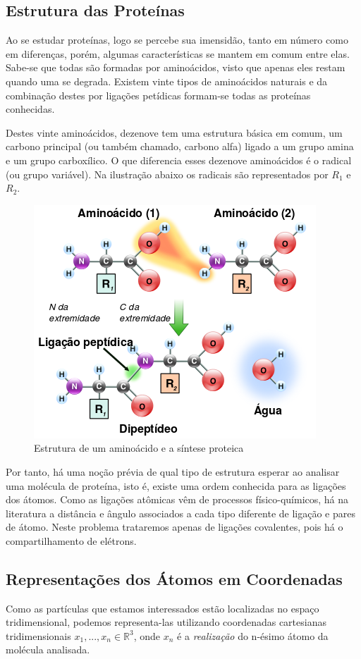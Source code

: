 \documentclass[a4paper,12pt]{article}
\begin{document}
	\subsection{Estrutura das Proteínas}
	Ao se estudar proteínas, logo se percebe sua imensidão, tanto em número como em diferenças, porém, algumas características se mantem em comum entre elas. Sabe-se que todas são formadas por aminoácidos, visto que apenas eles restam quando uma se degrada. Existem vinte tipos de aminoácidos naturais e da combinação destes por ligações petídicas formam-se todas as proteínas conhecidas. \cite{fidalgotese}
	
	Destes vinte aminoácidos, dezenove tem uma estrutura básica em comum, um carbono principal (ou também chamado, carbono alfa) ligado a um grupo amina e um grupo carboxílico. O que diferencia esses dezenove aminoácidos é o radical (ou grupo variável). Na ilustração abaixo os radicais são representados por $R_1$ e $R_2$.
	\\
	\begin{figure}[H]
		\begin{center}
			\includegraphics[width=0.6\linewidth]{Peptidformation.png}
		\end{center}
		\caption{Estrutura de um aminoácido e a síntese proteica}
		\label{}
	\end{figure}
	
	Por tanto, há uma noção prévia de qual tipo de estrutura esperar ao analisar uma molécula de proteína, isto é, existe uma ordem conhecida para as ligações dos átomos. Como as ligações atômicas vêm de processos físico-químicos, há na literatura a distância e ângulo associados a cada tipo diferente de ligação e pares de átomo. Neste problema trataremos apenas de ligações covalentes, pois há o compartilhamento de elétrons.
	
	\subsection{Representações dos Átomos em Coordenadas\label{sec:bi}}
	Como as partículas que estamos interessados estão localizadas no espaço tridimensional, podemos representa-las utilizando coordenadas cartesianas tridimensionais $x_1, ...,x_n \in\mathbb{R}^3$, onde $x_n$ é a \textit{realização} do n-ésimo átomo da molécula analisada. 
	
\end{document}
